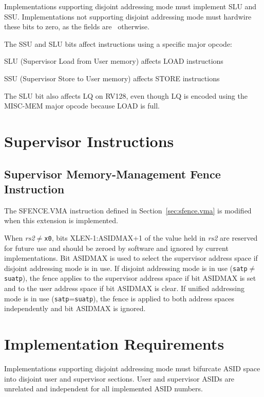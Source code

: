 Implementations supporting disjoint addressing mode must implement SLU and
SSU.  Implementations not supporting disjoint addressing mode must hardwire
these bits to zero, as the fields are \wpri\ otherwise.

The SSU and SLU bits affect instructions using a specific major opcode:
\begin{compactitem}
\item SLU (Supervisor Load from User memory) affects LOAD instructions
\item SSU (Supervisor Store to User memory) affects STORE instructions
\end{compactitem}

The SLU bit also affects LQ on RV128, even though LQ is encoded using the
MISC-MEM major opcode because LOAD is full.

\section {Supervisor Instructions}

\subsection{Supervisor Memory-Management Fence Instruction}
\label{s:das:sfence.vma}

The SFENCE.VMA instruction defined in Section~\ref{sec:sfence.vma} is
modified when this extension is implemented.

When {\em rs2}$\neq${\tt x0}, bits XLEN-1:ASIDMAX+1 of the value held in
{\em rs2} are reserved for future use and should be zeroed by software and
ignored by current implementations.  Bit ASIDMAX is used to select the
supervisor address space if disjoint addressing mode is in use.  If
disjoint addressing mode is in use ({\tt satp}$\neq${\tt suatp}), the fence
applies to the supervisor address space if bit ASIDMAX is set and to the
user address space if bit ASIDMAX is clear.  If unified addressing mode is
in use ({\tt satp}={\tt suatp}), the fence is applied to both address
spaces independently and bit ASIDMAX is ignored.

\section{Implementation Requirements}

Implementations supporting disjoint addressing mode must bifurcate ASID
space into disjoint user and supervisor sections.  User and supervisor
ASIDs are unrelated and independent for all implemented ASID numbers.

